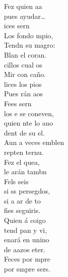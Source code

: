 \documentclass[12pt]{article}
\begin{document}
\begin{multicols*}{2}
\begin{cancion}
	Fez quien aa\\
	pues  ayudar…\\
	ices sern\\
	Los  fondo mpio,\\
	Tendn su magro:\\
	Blan el coran. \\
	cillos cual os \\
	Mir con caño.\\
	lices los pios\\
	Pues rán aos\\
	Fees sern\\
	los e se coneven,\\
	quien nte lo ano\\
	dent de su el.\\
	Aun a veces emblen\\
	repten ternu.\\
	Fez el quea,\\
	le arán tambn\\
	Fels seis \\
	si ss persegdos,\\
	si a ar de to\\
	fies seguiris.\\
	Quien á coigo\\
	tend pan y vi,  \\
	enará en unino\\
	de aazos eter.\\
	Feces por mpre\\
	por smpre sers.\\\jump\\

\end{cancion}
\end{multicols*}
\end{document}
